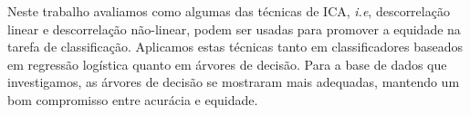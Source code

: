\documentclass[11pt]{article}
\begin{document}
Neste trabalho avaliamos como algumas das técnicas de ICA, \emph{i.e},
descorrelação linear e descorrelação não-linear, podem ser usadas para
promover a equidade na tarefa de classificação. Aplicamos estas técnicas
tanto em classificadores baseados em regressão logística quanto em
árvores de decisão. Para a base de dados que investigamos, as árvores de
decisão se mostraram mais adequadas, mantendo um bom compromisso entre
acurácia e equidade.


    
    
    
    
\end{document}
